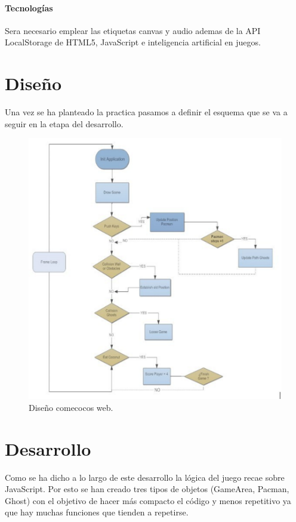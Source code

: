 \paragraph{Tecnologías}
Sera necesario emplear las etiquetas canvas y audio ademas de la API LocalStorage de HTML5, JavaScript e inteligencia artificial en juegos. 
\section{Diseño}
Una vez se ha planteado la practica pasamos a definir el esquema que se va a seguir en la etapa del desarrollo. 
\begin{figure}[!h]
\begin{center}
  \includegraphics[width=0.7\linewidth]{Figures/esquemaP1}
	\decoRule
	\caption[Diseño comecocos web]{Diseño comecocos web.}
\label{fig:Pacman_Intro}
\end{center}
\end{figure}
\section{Desarrollo}
Como se ha dicho a lo largo de este desarrollo la lógica del juego recae sobre JavaScript. Por esto se han creado tres tipos de objetos (GameArea, Pacman, Ghost) con el objetivo de hacer más compacto el código y menos repetitivo ya que hay muchas funciones que tienden a repetirse.
